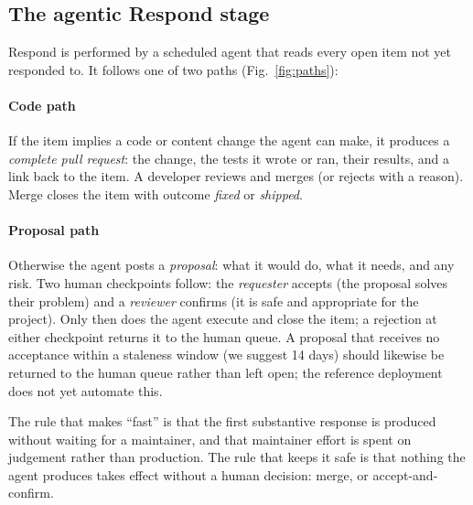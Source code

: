 \subsection{The agentic Respond stage}
Respond is performed by a scheduled agent that reads every open item not yet responded to. It follows one of two paths (Fig.~\ref{fig:paths}):

\paragraph{Code path} If the item implies a code or content change the agent can make, it produces a \emph{complete pull request}: the change, the tests it wrote or ran, their results, and a link back to the item. A developer reviews and merges (or rejects with a reason). Merge closes the item with outcome \emph{fixed} or \emph{shipped}.

\paragraph{Proposal path} Otherwise the agent posts a \emph{proposal}: what it would do, what it needs, and any risk. Two human checkpoints follow: the \emph{requester} accepts (the proposal solves their problem) and a \emph{reviewer} confirms (it is safe and appropriate for the project). Only then does the agent execute and close the item; a rejection at either checkpoint returns it to the human queue. A proposal that receives no acceptance within a staleness window (we suggest 14 days) should likewise be returned to the human queue rather than left open; the reference deployment does not yet automate this.

The rule that makes \ffrs{} ``fast'' is that the first substantive response is produced without waiting for a maintainer, and that maintainer effort is spent on judgement rather than production. The rule that keeps it safe is that nothing the agent produces takes effect without a human decision: merge, or accept-and-confirm.

